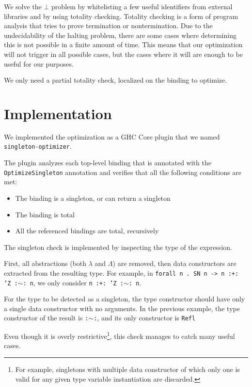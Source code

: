 We solve the $\bot$ problem by whitelisting a few useful identifiers from external libraries and by using totality checking.
Totality checking is a form of program analysis that tries to prove termination or nontermination.
Due to the undecidability of the halting problem, there are some cases where determining this is not possible in a finite amount of time.
This means that our optimization will not trigger in all possible cases, but the cases where it will are enough to be useful for our purposes.

We only need a partial totality check, localized on the binding to optimize.

\section{Implementation}
\label{sec:implementation}

We implemented the optimization as a GHC Core plugin that we named \texttt{singleton-optimizer}.

The plugin analyzes each top-level binding that is annotated with the \texttt{OptimizeSingleton} annotation and verifies that all the following conditions are met:

\begin{itemize}
  \item{The binding is a singleton, or can return a singleton}
  \item{The binding is total}
  \item{All the referenced bindings are total, recursively}
\end{itemize}

The singleton check is implemented by inspecting the type of the expression.

First, all abstractions (both $\lambda$ and $\Lambda$) are removed, then data constructors are extracted from the resulting type.
For example, in \texttt{forall n . SN n -> n :+: 'Z :$\sim$: n}, we only consider \texttt{n :+: 'Z :$\sim$: n}.

For the type to be detected as a singleton, the type constructor should have only a single data constructor with no arguments.
In the previous example, the type constructor of the result is \texttt{:$\sim$:}, and its only constructor is \texttt{Refl}

Even though it is overly restrictive\footnote{For example, singletons with multiple data constructor of which only one is valid for any given type variable instantiation are discarded.}, this check manages to catch many useful cases.

